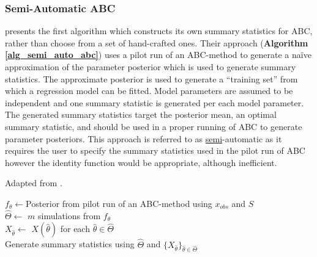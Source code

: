 \documentclass[11pt,a4paper]{article}
\theoremstyle{break}
\begin{document}
\subsubsection{Semi-Automatic ABC}\label{sec_semi_automatic_abc}
  \cite[]{constructing_summary_statistics_for_approximate_bayesian_computation_semi_automatic_ABC} presents the first algorithm which constructs its own summary statistics for ABC, rather than choose from a set of hand-crafted ones. Their approach (\textbf{Algorithm \ref{alg_semi_auto_abc}}) uses a pilot run of an ABC-method to generate a na\"ive approximation of the parameter posterior which is used to generate summary statistics. The approximate posterior is used to generate a ``training set'' from which a regression model can be fitted. Model parameters are assumed to be independent and one summary statistic is generated per each model parameter. The generated summary statistics target the posterior mean, an optimal summary statistic, and should be used in a proper running of ABC to generate parameter posteriors. This approach is referred to as \underline{semi}-automatic as it requires the user to specify the summary statistics used in the pilot run of ABC however the identity function would be appropriate, although inefficient.

  \begin{box_algorithm}\label{alg_semi_auto_abc}
    Adapted from \cite[]{constructing_summary_statistics_for_approximate_bayesian_computation_semi_automatic_ABC}.
    \par
    \begin{algorithm}[H]
      $f_\theta\leftarrow$Posterior from pilot run of an ABC-method using $x_{obs}$ and $S$\label{alg_semi_auto_abc_pilot_run}\\
      $\hat\Theta\leftarrow$ $m$ simulations from $f_\theta$\\
      $X_{\hat\theta}\leftarrow$ $X\left(\hat\theta\right)$ for each $\hat\theta\in\hat\Theta$\\
      Generate summary statistics using $\hat\Theta$ and $\{X_{\hat\theta}\}_{\hat\theta\in\hat\Theta}$\label{alg_semi_auto_abc_estimate_ss}
    \end{algorithm}
  \end{box_algorithm}
\end{document}
